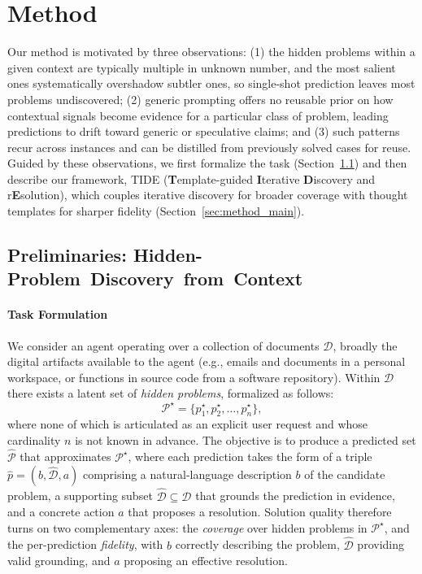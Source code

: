 \section{Method}

Our method is motivated by three observations:
(1) the hidden problems within a given context are typically multiple in unknown number, and the most salient ones systematically overshadow subtler ones, so single-shot prediction leaves most problems undiscovered;
(2) generic prompting offers no reusable prior on how contextual signals become evidence for a particular class of problem, leading predictions to drift toward generic or speculative claims; and
(3) such patterns recur across instances and can be distilled from previously solved cases for reuse.
Guided by these observations, we first formalize the task (Section~\ref{sec:preliminaries}) and then describe our framework, \textsc{TIDE} (\textbf{T}emplate-guided \textbf{I}terative \textbf{D}iscovery and r\textbf{E}solution), which couples iterative discovery for broader coverage with thought templates for sharper fidelity (Section~\ref{sec:method_main}).

\subsection{Preliminaries: Hidden-Problem~Discovery~from~Context}
\label{sec:preliminaries}

\paragraph{Task Formulation}
We consider an agent operating over a collection of documents $\mathcal{D}$, broadly the digital artifacts available to the agent (e.g., emails and documents in a personal workspace, or functions in source code from a software repository). Within $\mathcal{D}$ there exists a latent set of \emph{hidden problems}, formalized as follows:
\[
\mathcal{P}^{\star} = \{p_1^{\star}, p_2^{\star}, \dots, p_n^{\star}\},
\]
where none of which is articulated as an explicit user request and whose cardinality $n$ is not known in advance. The objective is to produce a predicted set $\hat{\mathcal{P}}$ that approximates $\mathcal{P}^{\star}$, where each prediction takes the form of a triple $\hat{p} = (b, \hat{\mathcal{D}}, a)$ comprising a natural-language description $b$ of the candidate problem, a supporting subset $\hat{\mathcal{D}} \subseteq \mathcal{D}$ that grounds the prediction in evidence, and a concrete action $a$ that proposes a resolution. Solution quality therefore turns on two complementary axes: the \textit{coverage} over hidden problems in $\mathcal{P}^{\star}$, and the per-prediction \textit{fidelity}, with $b$ correctly describing the problem, $\hat{\mathcal{D}}$ providing valid grounding, and $a$ proposing an effective resolution.

